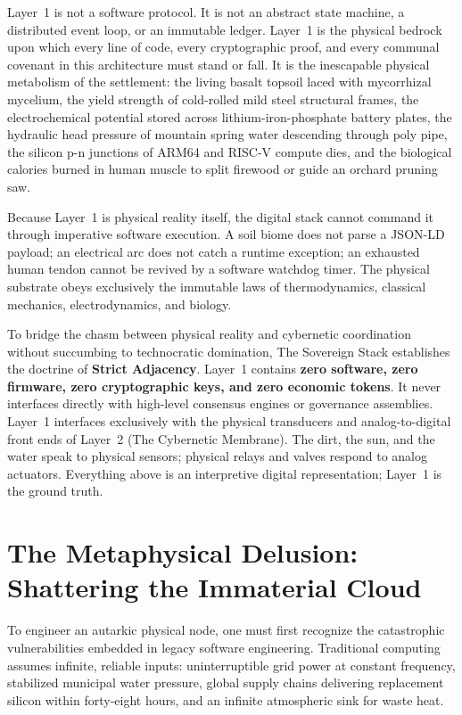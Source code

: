 Layer~1 is not a software protocol. It is not an abstract state machine, a distributed event loop, or an immutable ledger. Layer~1 is the physical bedrock upon which every line of code, every cryptographic proof, and every communal covenant in this architecture must stand or fall. It is the inescapable physical metabolism of the settlement: the living basalt topsoil laced with mycorrhizal mycelium, the yield strength of cold-rolled mild steel structural frames, the electrochemical potential stored across lithium-iron-phosphate battery plates, the hydraulic head pressure of mountain spring water descending through poly pipe, the silicon p-n junctions of ARM64 and RISC-V compute dies, and the biological calories burned in human muscle to split firewood or guide an orchard pruning saw.

Because Layer~1 is physical reality itself, the digital stack cannot command it through imperative software execution. A soil biome does not parse a JSON-LD payload; an electrical arc does not catch a runtime exception; an exhausted human tendon cannot be revived by a software watchdog timer. The physical substrate obeys exclusively the immutable laws of thermodynamics, classical mechanics, electrodynamics, and biology. 

To bridge the chasm between physical reality and cybernetic coordination without succumbing to technocratic domination, The Sovereign Stack establishes the doctrine of \textbf{Strict Adjacency}. Layer~1 contains \textbf{zero software, zero firmware, zero cryptographic keys, and zero economic tokens}. It never interfaces directly with high-level consensus engines or governance assemblies. Layer~1 interfaces exclusively with the physical transducers and analog-to-digital front ends of Layer~2 (The Cybernetic Membrane). The dirt, the sun, and the water speak to physical sensors; physical relays and valves respond to analog actuators. Everything above is an interpretive digital representation; Layer~1 is the ground truth.

\section{The Metaphysical Delusion: Shattering the Immaterial Cloud}
\label{sec:intro_delusion}

To engineer an autarkic physical node, one must first recognize the catastrophic vulnerabilities embedded in legacy software engineering. Traditional computing assumes infinite, reliable inputs: uninterruptible grid power at constant frequency, stabilized municipal water pressure, global supply chains delivering replacement silicon within forty-eight hours, and an infinite atmospheric sink for waste heat. 

